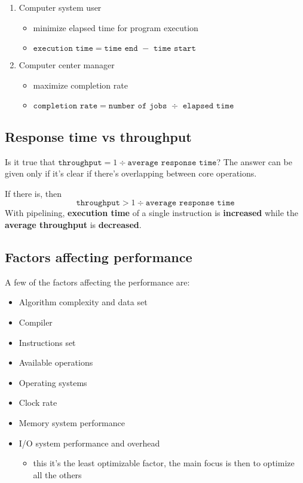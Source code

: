 \documentclass[english]{article}
\begin{document}
\begin{enumerate}
  \item Computer system user
        \begin{itemize}
          \item minimize elapsed time for program execution
          \item \(\texttt{execution time} = \texttt{time end } - \texttt{ time start}\)
        \end{itemize}
  \item Computer center manager
        \begin{itemize}
          \item maximize completion rate
          \item \(\texttt{completion rate} = \texttt{number of jobs } \div \texttt{ elapsed time}\)
        \end{itemize}
\end{enumerate}

\subsection{Response time vs throughput}

Is it true that
\(\texttt{throughput} = {1} \div { \texttt{average response time}}\)?
The answer can be given only if it's clear if there's overlapping between core operations.

If there is, then \[ \texttt{throughput} > {1} \div {\texttt{average response time}} \]
With pipelining, \textbf{execution time} of a single instruction is \textbf{increased} while the \textbf{average throughput} is \textbf{decreased}.

\subsection{Factors affecting performance}

A few of the factors affecting the performance are:

\begin{itemize}
  \item Algorithm complexity and data set
  \item Compiler
  \item Instructions set
  \item Available operations
  \item Operating systems
  \item Clock rate
  \item Memory system performance
  \item I/O system performance and overhead
        \begin{itemize}
          \item this it's the least optimizable factor, the main focus is then to optimize all the others
        \end{itemize}
\end{itemize}
\end{document}

